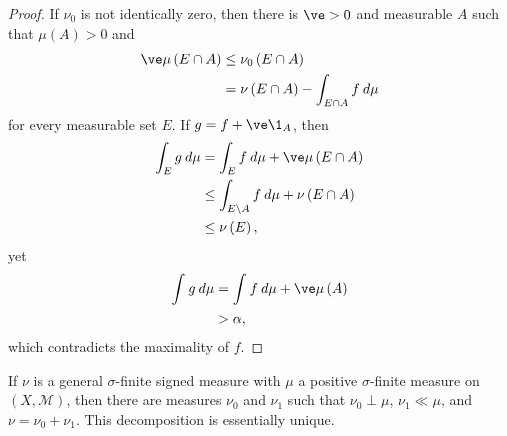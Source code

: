 \documentclass[10pt]{mypackage}
\begin{document}
\begin{proof}
  If $\nu_0$ is not identically zero, then there is $\ve > 0$ and measurable $A$ such that $\mu\left( A \right) > 0$ and
  \begin{align*}
    \ve \mu\left( E\cap A \right) &\leq \nu_0\left( E\cap A \right)\\
                                  &= \nu\left( E\cap A \right) - \int_{E\cap A}^{} f\:d\mu
  \end{align*}
  for every measurable set $E$. If $g = f + \ve \1_{A}$, then
  \begin{align*}
    \int_{E}^{} g\:d\mu &= \int_{E}^{} f\:d\mu + \ve\mu\left( E\cap A \right)\\
                        &\leq \int_{E\setminus A}^{} f\:d\mu + \nu\left( E\cap A \right)\\
                        &\leq \nu\left( E \right),
  \end{align*}
  yet
  \begin{align*}
    \int_{}^{} g\:d\mu &= \int_{}^{} f\:d\mu + \ve \mu\left( A \right)\\
                       &> \alpha,
  \end{align*}
  which contradicts the maximality of $f$.
\end{proof}
\begin{theorem}
  If $\nu$ is a general $\sigma$-finite signed measure with $\mu$ a positive $\sigma$-finite measure on $\left( X,\mathcal{M} \right)$, then there are measures $\nu_0$ and $\nu_1$ such that $\nu_0\perp\mu$, $\nu_1\ll\mu$, and $\nu = \nu_0 + \nu_1$. This decomposition is essentially unique.
\end{theorem}
\end{document}
